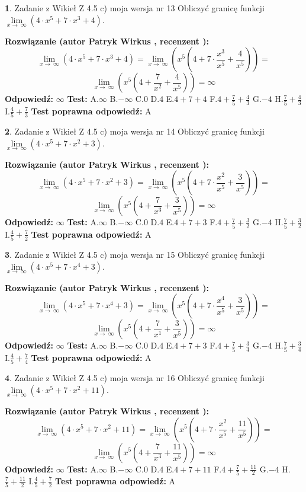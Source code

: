 \documentclass[12pt, a4paper]{article}
\theoremstyle{definition} %
\newtheorem{zad}{}
\newcommand{\zadStart}[1]{\begin{zad}#1\newline}
\newcommand{\zadStop}{\end{zad}}
\newcommand{\rozwStart}[2]{\noindent \textbf{Rozwiązanie (autor #1 , recenzent #2): }\newline}
\newcommand{\rozwStop}{\newline}
\newcommand{\odpStart}{\noindent \textbf{Odpowiedź:}\newline}
\newcommand{\odpStop}{\newline}
\newcommand{\testStart}{\noindent \textbf{Test:}\newline}
\newcommand{\testStop}{\newline}
\newcommand{\kluczStart}{\noindent \textbf{Test poprawna odpowiedź:}\newline}
\newcommand{\kluczStop}{\newline}
\begin{document}
\zadStart{Zadanie z Wikieł Z 4.5 c) moja wersja nr 13}
Obliczyć granicę funkcji  $\lim\limits_{x\to\ \infty}(4 \cdot x^{5}+7 \cdot x^{3}+4)$.
\zadStop
\rozwStart{Patryk Wirkus}{}
$$\lim\limits_{x\to\ \infty}(4 \cdot x^{5}+7 \cdot x^{3}+4) = \lim\limits_{x\to\ \infty}(x^{5}(4 +7 \cdot \frac{x^{3}}{x^{5}}+\frac{4}{x^{5}})) =$$ $$\lim\limits_{x\to\ \infty}(x^{5}(4 +\frac{7}{x^{2}}+\frac{4}{x^{5}})) =\infty$$
\rozwStop
\odpStart
$\infty$
\odpStop
\testStart
A.$\infty$ B.$-\infty$ C.$0$ D.$4$ E.$4 + 7 + 4$
F.$4+\frac{7}{5}+\frac{4}{3}$ G.$-4$
H.$\frac{7}{5}+\frac{4}{3}$
I.$\frac{4}{5}+\frac{7}{3}$
\testStop
\kluczStart
A
\kluczStop



\zadStart{Zadanie z Wikieł Z 4.5 c) moja wersja nr 14}
Obliczyć granicę funkcji  $\lim\limits_{x\to\ \infty}(4 \cdot x^{5}+7 \cdot x^{2}+3)$.
\zadStop
\rozwStart{Patryk Wirkus}{}
$$\lim\limits_{x\to\ \infty}(4 \cdot x^{5}+7 \cdot x^{2}+3) = \lim\limits_{x\to\ \infty}(x^{5}(4 +7 \cdot \frac{x^{2}}{x^{5}}+\frac{3}{x^{5}})) =$$ $$\lim\limits_{x\to\ \infty}(x^{5}(4 +\frac{7}{x^{3}}+\frac{3}{x^{5}})) =\infty$$
\rozwStop
\odpStart
$\infty$
\odpStop
\testStart
A.$\infty$ B.$-\infty$ C.$0$ D.$4$ E.$4 + 7 + 3$
F.$4+\frac{7}{5}+\frac{3}{2}$ G.$-4$
H.$\frac{7}{5}+\frac{3}{2}$
I.$\frac{4}{5}+\frac{7}{2}$
\testStop
\kluczStart
A
\kluczStop



\zadStart{Zadanie z Wikieł Z 4.5 c) moja wersja nr 15}
Obliczyć granicę funkcji  $\lim\limits_{x\to\ \infty}(4 \cdot x^{5}+7 \cdot x^{4}+3)$.
\zadStop
\rozwStart{Patryk Wirkus}{}
$$\lim\limits_{x\to\ \infty}(4 \cdot x^{5}+7 \cdot x^{4}+3) = \lim\limits_{x\to\ \infty}(x^{5}(4 +7 \cdot \frac{x^{4}}{x^{5}}+\frac{3}{x^{5}})) =$$ $$\lim\limits_{x\to\ \infty}(x^{5}(4 +\frac{7}{x^{1}}+\frac{3}{x^{5}})) =\infty$$
\rozwStop
\odpStart
$\infty$
\odpStop
\testStart
A.$\infty$ B.$-\infty$ C.$0$ D.$4$ E.$4 + 7 + 3$
F.$4+\frac{7}{5}+\frac{3}{4}$ G.$-4$
H.$\frac{7}{5}+\frac{3}{4}$
I.$\frac{4}{5}+\frac{7}{4}$
\testStop
\kluczStart
A
\kluczStop



\zadStart{Zadanie z Wikieł Z 4.5 c) moja wersja nr 16}
Obliczyć granicę funkcji  $\lim\limits_{x\to\ \infty}(4 \cdot x^{5}+7 \cdot x^{2}+11)$.
\zadStop
\rozwStart{Patryk Wirkus}{}
$$\lim\limits_{x\to\ \infty}(4 \cdot x^{5}+7 \cdot x^{2}+11) = \lim\limits_{x\to\ \infty}(x^{5}(4 +7 \cdot \frac{x^{2}}{x^{5}}+\frac{11}{x^{5}})) =$$ $$\lim\limits_{x\to\ \infty}(x^{5}(4 +\frac{7}{x^{3}}+\frac{11}{x^{5}})) =\infty$$
\rozwStop
\odpStart
$\infty$
\odpStop
\testStart
A.$\infty$ B.$-\infty$ C.$0$ D.$4$ E.$4 + 7 + 11$
F.$4+\frac{7}{5}+\frac{11}{2}$ G.$-4$
H.$\frac{7}{5}+\frac{11}{2}$
I.$\frac{4}{5}+\frac{7}{2}$
\testStop
\kluczStart
A
\kluczStop
\end{document}
